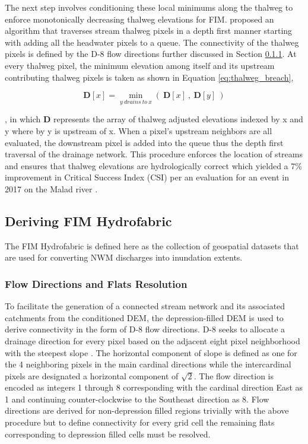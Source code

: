 The next step involves conditioning these local minimums along the thalweg to enforce monotonically decreasing thalweg elevations for FIM.
 proposed an algorithm that traverses stream thalweg pixels in a depth first manner starting with adding all the headwater pixels to a queue. 
The connectivity of the thalweg pixels is defined by the D-8 flow directions further discussed in Section \ref{ssec:flow_direction_and_flat_resolution}.
At every thalweg pixel, the minimum elevation among itself and its upstream contributing thalweg pixels is taken as shown in Equation \ref{eq:thalweg_breach},
%
\begin{linenomath*}
\begin{equation}
\label{eq:thalweg_breach}
\textbf{D}[x] = \min_{y\ drains\ to\ x} {(\ \textbf{D}[x]\ ,\ \textbf{D}[y]\ )}
\end{equation}
\end{linenomath*}
%
, in which \textbf{D} represents the array of thalweg adjusted elevations indexed by x and y where by y is upstream of x. 
When a pixel's upstream neighbors are all evaluated, the downstream pixel is added into the queue thus the depth first traversal of the drainage network.
This procedure enforces the location of streams and ensures that thalweg elevations are hydrologically correct which yielded a 7\% improvement in Critical Success Index (CSI) per an evaluation for an event in 2017 on the Malad river \cite{garousi2019terrain}.
%
\subsection{Deriving FIM Hydrofabric}
\label{ssec:deriving_fim_hydrofabric}
%
The FIM Hydrofabric is defined here as the collection of geospatial datasets that are used for converting NWM discharges into inundation extents.
%
\subsubsection{Flow Directions and Flats Resolution}
\label{ssec:flow_direction_and_flat_resolution}
%
To facilitate the generation of a connected stream network and its associated catchments from the conditioned DEM, the depression-filled DEM is used to derive connectivity in the form of D-8 flow directions.
D-8 seeks to allocate a drainage direction for every pixel based on the adjacent eight pixel neighborhood with the steepest slope \cite{o1984extraction}.
The horizontal component of slope is defined as one for the 4 neighboring pixels in the main cardinal directions while the intercardinal pixels are designated a horizontal component of $\sqrt{2}$. 
The flow direction is encoded as integers 1 through 8 corresponding with the cardinal direction East as 1 and continuing counter-clockwise to the Southeast direction as 8. 
Flow directions are derived for non-depression filled regions trivially with the above procedure but to define connectivity for every grid cell the remaining flats corresponding to depression filled cells must be resolved.

